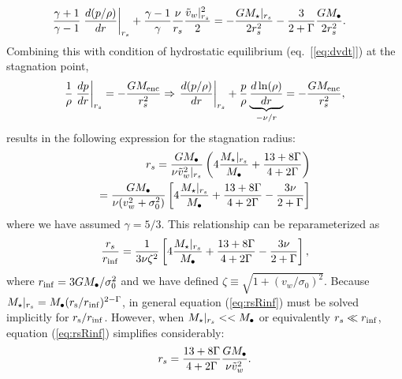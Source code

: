 \begin{align}
&\frac{\gamma+1}{\gamma-1}
\left.\frac{d (p/\rho)}{d r}\right|_{r_s}+ \frac{\gamma-1}{\gamma} \frac{\nu}{r_s} \frac{\tilde{v}_{w}|_{r_s}^{2}}{2} = -\frac{G
  M_{\star}|_{r_s}}{2 r_s^2} -\frac{3}{2+\Gamma} \frac{G M_{\bullet}}{2 r_s^2}.  \label{eq:rs1}
\end{align}
Combining this with condition of hydrostatic equilibrium (eq.~[\ref{eq:dvdt}]) at the stagnation point,
\begin{align}
\frac{1}{\rho}\left.\frac{d p}{d r}\right|_{r_s}=- \frac{GM_{\rm enc}}{r_s^2} \Rightarrow
\left.\frac{d (p/\rho)}{d r}\right|_{r_s} +\frac{p}{\rho}
\underbrace{\frac{d\ln(\rho)}{dr}}_{-\nu/r} = -\frac{G M_{\rm enc}}{r_s^2}, \label{eq:HSE}
\end{align}
results in the following expression for the stagnation radius:
\begin{align}
r_s=\frac{G M_{\bullet}}{\nu \tilde{v}_{w}^{2}|_{r_s}}\left(4
  \frac{M_{\star}|_{r_s}}{M_{\bullet}} +\frac{13+ 8\Gamma}{4+2\Gamma}\right) \nonumber \\
=\frac{G M_{\bullet}}{\nu (v_w^{2}+\sigma_0^2)}\left[4
    \frac{M_{\star}|_{r_s}}{M_{\bullet}} +\frac{13+ 8\Gamma}{4+2\Gamma}-\frac{3\nu }{2+\Gamma}\right]
\label{eq:rs2main}
\end{align}
where we have assumed $\gamma=5/3$.  This relationship can be reparameterized as
\begin{align}
  \frac{r_s}{r_{\rm inf}}=\frac{1}{3\nu \zeta^2} \left[4\frac{M_{\star}|_{r_s}}{M_{\bullet}} +\frac{13+8\Gamma}{4+2\Gamma}- \frac{3\nu }{2+\Gamma}\right],
  \label{eq:rsRinf}
\end{align}
where $r_{\rm inf}=3 G M_{\bullet}/\sigma_0^2$ and we have defined $\zeta \equiv \sqrt{1 + (v_w/\sigma_0)^2}$.  Because $M_{\star}|_{r_s} = M_{\bullet}(r_{\rm s}/r_{\rm inf})^{2-\Gamma}$, in general equation (\ref{eq:rsRinf}) must be solved implicitly for $r_{\rm s}/r_{\rm inf}$.  However, when $M_{\star}|_{r_s} << M_{\bullet}$ or equivalently $r_s \ll r_{\rm inf}$, equation (\ref{eq:rsRinf}) simplifies considerably:
\begin{align}
r_s=\frac{13+8\Gamma}{4+2\Gamma} \frac{G M_{\bullet}}{\nu \tilde{v}_{w}^2}.
\end{align}
